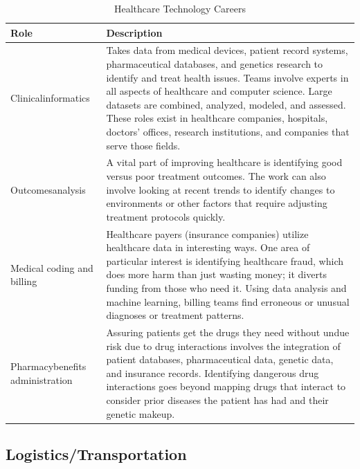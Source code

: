 \begin{table}[H]
	\begin{center}
		\caption{Healthcare Technology Careers}
		\vskip 4pt
		\begin{tabular}{p{1in}|p{3.4in}} 
			\textbf{Role} & \textbf{Description}\\
			\hline
			Clinical\linebreak informatics & Takes data from medical devices, patient record systems, pharmaceutical databases, and genetics research to identify and treat health issues. Teams involve experts in all aspects of healthcare and computer science. Large datasets are combined, analyzed, modeled, and assessed. These roles exist in healthcare companies, hospitals, doctors' offices, research institutions, and companies that serve those fields.\\
			\hline
			Outcomes\linebreak analysis & A vital part of improving healthcare is identifying good versus poor treatment outcomes. The work can also involve looking at recent trends to identify changes to environments or other factors that require adjusting treatment protocols quickly.\\
			\hline
			Medical coding and billing & Healthcare payers (insurance companies) utilize healthcare data in interesting ways. One area of particular interest is identifying healthcare fraud, which does more harm than just wasting money; it diverts funding from those who need it. Using data analysis and machine learning, billing teams find erroneous or unusual diagnoses or treatment patterns.\\
			\hline
			Pharmacy\linebreak benefits administration & Assuring patients get the drugs they need without undue risk due to drug interactions involves the integration of patient databases, pharmaceutical data, genetic data, and insurance records. Identifying dangerous drug interactions goes beyond mapping drugs that interact to consider prior diseases the patient has had and their genetic makeup.\\
			\hline
		\end{tabular}
	\end{center}
\end{table}

\subsection{Logistics/Transportation}


